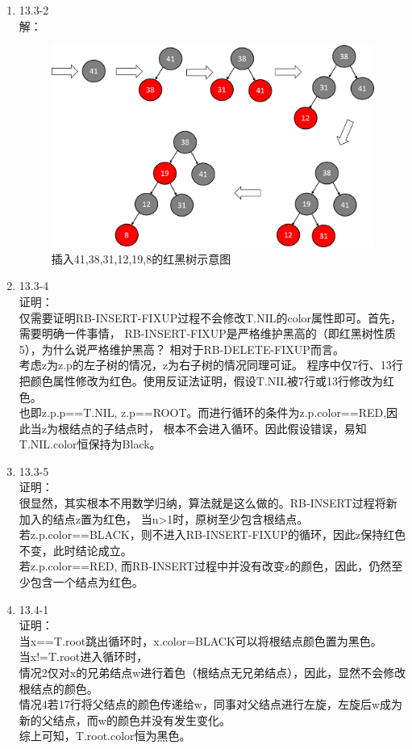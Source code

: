 \documentclass[UTF8]{ctexart}
\begin{document}
\begin{enumerate}
	\item 13.3-2 \\
	解：\\
		\begin{figure}[H]
		\centering
        \caption{插入41,38,31,12,19,8的红黑树示意图}
		\includegraphics[scale=0.65]{13_3_2.png}
		\end{figure}
		
	\item 13.3-4 \\
	证明：\\
		仅需要证明RB-INSERT-FIXUP过程不会修改T.NIL的color属性即可。首先，需要明确一件事情，
		RB-INSERT-FIXUP是严格维护黑高的（即红黑树性质5），为什么说严格维护黑高？
		相对于RB-DELETE-FIXUP而言。\\
		考虑z为z.p的左子树的情况，z为右子树的情况同理可证。
		程序中仅7行、13行把颜色属性修改为红色。使用反证法证明，假设T.NIL被7行或13行修改为红色。\\
		也即z.p.p==T.NIL, z.p==ROOT。而进行循环的条件为z.p.color==RED,因此当z为根结点的子结点时，
		根本不会进入循环。因此假设错误，易知T.NIL.color恒保持为Black。
	
	\item 13.3-5 \\
	证明：\\
		很显然，其实根本不用数学归纳，算法就是这么做的。RB-INSERT过程将新加入的结点z置为红色，
		当n>1时，原树至少包含根结点。\\
		若z.p.color==BLACK，则不进入RB-INSERT-FIXUP的循环，因此z保持红色不变，此时结论成立。\\
		若z.p.color==RED, 而RB-INSERT过程中并没有改变z的颜色，因此，仍然至少包含一个结点为红色。
	
	\item 13.4-1 \\
	证明：\\
		当x==T.root跳出循环时，x.color=BLACK可以将根结点颜色置为黑色。\\
		当x!=T.root进入循环时，\\
		情况2仅对x的兄弟结点w进行着色（根结点无兄弟结点），因此，显然不会修改根结点的颜色。\\
		情况4若17行将父结点的颜色传递给w，同事对父结点进行左旋，左旋后w成为新的父结点，而w的颜色并没有发生变化。\\
		综上可知，T.root.color恒为黑色。
	

\end{enumerate}
\end{document}
